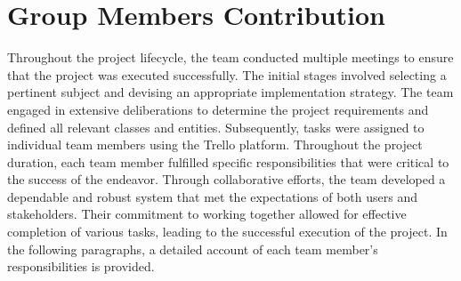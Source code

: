 \newpage
\section{Group Members Contribution}
\par
Throughout the project lifecycle, the team conducted multiple meetings to ensure that the project was executed successfully. The initial stages involved selecting a pertinent subject and devising an appropriate implementation strategy. The team engaged in extensive deliberations to determine the project requirements and defined all relevant classes and entities. Subsequently, tasks were assigned to individual team members using the Trello platform. Throughout the project duration, each team member fulfilled specific responsibilities that were critical to the success of the endeavor. Through collaborative efforts, the team developed a dependable and robust system that met the expectations of both users and stakeholders. Their commitment to working together allowed for effective completion of various tasks, leading to the successful execution of the project. In the following paragraphs, a detailed account of each team member's responsibilities is provided.

